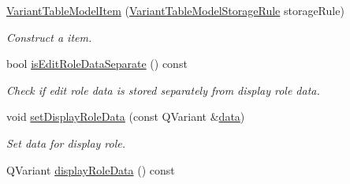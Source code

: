 \begin{DoxyCompactItemize}
\item 
\hyperlink{class_mdt_1_1_item_model_1_1_variant_table_model_item_a8d1627600fb6b7b3485c2c174c60dc49}{Variant\+Table\+Model\+Item} (\hyperlink{namespace_mdt_1_1_item_model_ad48e47e80d7e13b5b951346649748190}{Variant\+Table\+Model\+Storage\+Rule} storage\+Rule)\hypertarget{class_mdt_1_1_item_model_1_1_variant_table_model_item_a8d1627600fb6b7b3485c2c174c60dc49}{}\label{class_mdt_1_1_item_model_1_1_variant_table_model_item_a8d1627600fb6b7b3485c2c174c60dc49}

\begin{DoxyCompactList}\small\item\em Construct a item. \end{DoxyCompactList}\item 
bool \hyperlink{class_mdt_1_1_item_model_1_1_variant_table_model_item_a5c9114039113ece5ed6fdf8fb3017633}{is\+Edit\+Role\+Data\+Separate} () const \hypertarget{class_mdt_1_1_item_model_1_1_variant_table_model_item_a5c9114039113ece5ed6fdf8fb3017633}{}\label{class_mdt_1_1_item_model_1_1_variant_table_model_item_a5c9114039113ece5ed6fdf8fb3017633}

\begin{DoxyCompactList}\small\item\em Check if edit role data is stored separately from display role data. \end{DoxyCompactList}\item 
void \hyperlink{class_mdt_1_1_item_model_1_1_variant_table_model_item_aa755ecdcbd747483eaa32083f77bb23b}{set\+Display\+Role\+Data} (const Q\+Variant \&\hyperlink{class_mdt_1_1_item_model_1_1_variant_table_model_item_af4c895c68f47b19a07e159325a31fbf3}{data})\hypertarget{class_mdt_1_1_item_model_1_1_variant_table_model_item_aa755ecdcbd747483eaa32083f77bb23b}{}\label{class_mdt_1_1_item_model_1_1_variant_table_model_item_aa755ecdcbd747483eaa32083f77bb23b}

\begin{DoxyCompactList}\small\item\em Set data for display role. \end{DoxyCompactList}\item 
Q\+Variant \hyperlink{class_mdt_1_1_item_model_1_1_variant_table_model_item_a90d2ac794b4f97d15f408e1b2f8de5d6}{display\+Role\+Data} () const \hypertarget{class_mdt_1_1_item_model_1_1_variant_table_model_item_a90d2ac794b4f97d15f408e1b2f8de5d6}{}\label{class_mdt_1_1_item_model_1_1_variant_table_model_item_a90d2ac794b4f97d15f408e1b2f8de5d6}


\end{DoxyCompactItemize}
